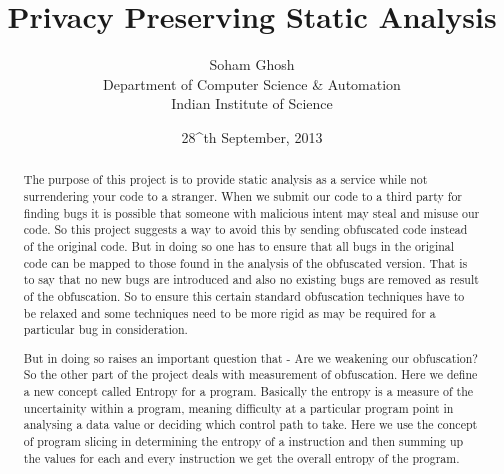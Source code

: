 
\pagestyle{empty}
\setlength{\topmargin}{ 0.25in}
\setlength{\columnsep}{2.0pc}
\setlength{\footheight}{0.0in}
\setlength{\headheight}{0.0in}
\setlength{\headsep}{0.0in}
\setlength{\oddsidemargin}{-.19in}
\setlength{\parindent}{1pc}
\textheight 8.75in
\textwidth 6.8in

\title{\large \bf Privacy Preserving Static Analysis }
\author{Soham Ghosh\\Department of Computer Science \& Automation\\Indian Institute of Science} 
\date{28^{th} September, 2013}
\maketitle
\thispagestyle{empty}

\begin{abstract}
The purpose of this project is to provide static analysis as a service while not surrendering your code to a stranger. When we submit our code to a third party for finding bugs it
 is possible that someone with malicious intent may steal and misuse our code. So this project suggests a way to avoid this by sending obfuscated code instead of the original code. 
 But in doing so one has to ensure that all bugs in the original code can be mapped to those found in the analysis of the obfuscated version. That is to say that no new bugs are 
 introduced and also no existing bugs are removed as result of the obfuscation. So to ensure this certain standard obfuscation techniques have to be relaxed and some techniques need 
 to be more rigid as may be required for a particular bug in consideration.
 
 But in doing so raises an important question that - Are we weakening our obfuscation? So the other part of the project deals with measurement of obfuscation. Here we define a new 
 concept called Entropy for a program. Basically the entropy is a measure of the uncertainity within a program, meaning difficulty at a particular program point in  analysing a 
 data value or deciding which control path to take. Here we use the concept of program slicing in determining the entropy of a instruction and then summing up the values for each 
 and every instruction we get the overall entropy of the program.
\end{abstract}
